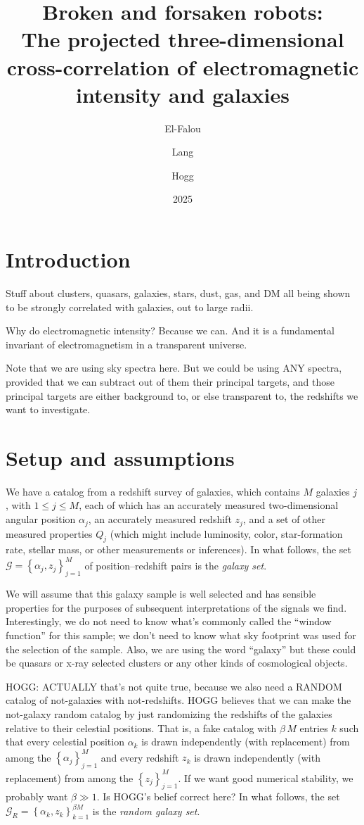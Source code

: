 \documentclass{article}
\title{\bfseries%
Broken and forsaken robots:\\
The projected three-dimensional cross-correlation of electromagnetic intensity and galaxies}
\author{El-Falou \and Lang \and Hogg}
\date{2025}
\newcommand{\setof}[1]{\left\{{#1}\right\}}
\newcommand{\set}[1]{\mathscr{#1}}
\begin{document}
\maketitle

\section{Introduction}
Stuff about clusters, quasars, galaxies, stars, dust, gas, and DM all being shown to be strongly correlated with galaxies, out to large radii.

Why do electromagnetic intensity? Because we can. And it is a fundamental invariant of electromagnetism in a transparent universe.

Note that we are using sky spectra here. But we could be using ANY spectra, provided that we can subtract out of them their principal targets, and those principal targets are either background to, or else transparent to, the redshifts we want to investigate.

\section{Setup and assumptions}
We have a catalog from a redshift survey of galaxies, which contains $M$ galaxies $j$, with $1\leq j\leq M$, each of which has an accurately measured two-dimensional angular position $\alpha_j$, an accurately measured redshift $z_j$, and a set of other measured properties $Q_j$ (which might include luminosity, color, star-formation rate, stellar mass, or other measurements or inferences).
In what follows, the set $\set{G}=\setof{\alpha_j, z_j}_{j=1}^M$ of position--redshift pairs is the \emph{galaxy set}.

We will assume that this galaxy sample is well selected and has sensible properties for the purposes of subsequent interpretations of the signals we find.
Interestingly, we do not need to know what's commonly called the ``window function'' for this sample; we don't need to know what sky footprint was used for the selection of the sample.
Also, we are using the word ``galaxy'' but these could be quasars or x-ray selected clusters or any other kinds of cosmological objects.

HOGG: ACTUALLY that's not quite true, because we also need a RANDOM catalog of not-galaxies with not-redshifts.
HOGG believes that we can make the not-galaxy random catalog by just randomizing the redshifts of the galaxies relative to their celestial positions.
That is, a fake catalog with $\beta\,M$ entries $k$ such that every celestial position $\alpha_k$ is drawn independently (with replacement) from among the $\setof{\alpha_j}_{j=1}^M$ and every redshift $z_k$ is drawn independently (with replacement) from among the $\setof{z_j}_{j=1}^M$.
If we want good numerical stability, we probably want $\beta\gg 1$.
Is HOGG's belief correct here?
In what follows, the set $\set{G}_R=\setof{\alpha_k,z_k}_{k=1}^{\beta M}$ is the \emph{random galaxy set}.
\end{document}

